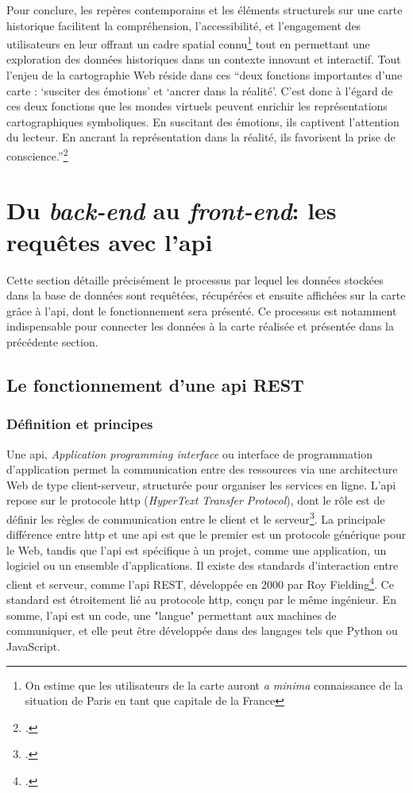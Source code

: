 Pour conclure, les repères contemporains et les éléments structurels sur une carte historique facilitent la compréhension, l'accessibilité, et l'engagement des utilisateurs en leur offrant un cadre spatial connu\footnote{On estime que les utilisateurs de la carte auront \textit{a minima} connaissance de la situation de Paris en tant que capitale de la France} tout en permettant une exploration des données historiques dans un contexte innovant et interactif. Tout l'enjeu de la cartographie Web réside dans ces \enquote{deux fonctions importantes d’une carte : \enquote{susciter des émotions} et \enquote{ancrer dans la réalité}. C’est donc à l’égard de ces deux fonctions que les mondes virtuels peuvent enrichir les représentations cartographiques symboliques. En suscitant des émotions, ils captivent l’attention du lecteur. En ancrant la représentation dans la réalité, ils favorisent la prise de conscience.}\footcite{BUCHERcarte2007}
\section{Du \textit{back-end} au \textit{front-end}: les requêtes avec l'\acrshort{api}}
Cette section détaille précisément le processus par lequel les données stockées dans la base de données sont requêtées, récupérées et ensuite affichées sur la carte grâce à l'\acrshort{api}, dont le fonctionnement sera présenté. Ce processus est notamment indispensable pour connecter les données à la carte réalisée et présentée dans la précédente section. 
\subsection{Le fonctionnement d'une \acrshort{api} REST}
\subsubsection{Définition et principes}
Une \acrshort{api}, \textit{Application programming interface} ou interface de programmation d'application permet la communication entre des ressources via une architecture Web de type client-serveur, structurée pour organiser les services en ligne. L'\acrshort{api} repose sur le protocole \acrshort{http} (\textit{HyperText Transfer Protocol}), dont le rôle est de définir les règles de communication entre le client et le serveur\footcite{KERVEGANModelisation2022}. La principale différence entre \acrshort{http} et une \acrshort{api} est que le premier est un protocole générique pour le Web, tandis que l'\acrshort{api} est spécifique à un projet, comme une application, un logiciel ou un ensemble d'applications. Il existe des standards d'interaction entre client et serveur, comme l'\acrshort{api} REST, développée en 2000 par Roy Fielding\footcite{FIELDINFarchitectural2000}. Ce standard est étroitement lié au protocole \acrshort{http}, conçu par le même ingénieur. En somme, l'\acrshort{api} est un code, une "langue" permettant aux machines de communiquer, et elle peut être développée dans des langages tels que Python ou JavaScript.

